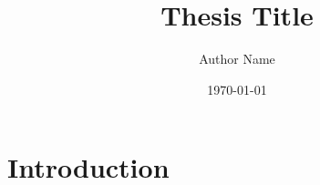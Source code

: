 \documentclass[11pt,a4paper]{report}
\title{Thesis Title}
\author{Author Name}
\date{\today}
\begin{document}
\maketitle
\tableofcontents

\chapter{Introduction}
\end{document}
